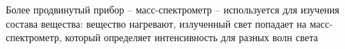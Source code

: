 Более продвинутый прибор -- масс-спектрометр -- используется для изучения состава вещества: вещество нагревают, излученный свет попадает на масс-спектрометр, который определяет интенсивность для разных волн света


